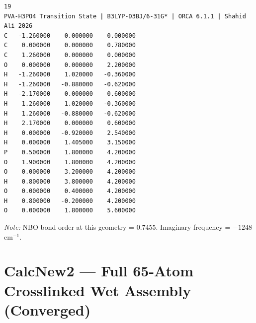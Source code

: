 \documentclass[12pt,a4paper]{report}
\begin{document}
\begin{verbatim}
19
PVA-H3PO4 Transition State | B3LYP-D3BJ/6-31G* | ORCA 6.1.1 | Shahid Ali 2026
C   -1.260000    0.000000    0.000000
C    0.000000    0.000000    0.780000
C    1.260000    0.000000    0.000000
O    0.000000    0.000000    2.200000
H   -1.260000    1.020000   -0.360000
H   -1.260000   -0.880000   -0.620000
H   -2.170000    0.000000    0.600000
H    1.260000    1.020000   -0.360000
H    1.260000   -0.880000   -0.620000
H    2.170000    0.000000    0.600000
H    0.000000   -0.920000    2.540000
H    0.000000    1.405000    3.150000
P    0.500000    1.800000    4.200000
O    1.900000    1.800000    4.200000
O    0.000000    3.200000    4.200000
H    0.800000    3.800000    4.200000
O    0.000000    0.400000    4.200000
H    0.800000   -0.200000    4.200000
O    0.000000    1.800000    5.600000
\end{verbatim}

\textit{Note:} NBO bond order at this geometry = 0.7455. Imaginary frequency = \(-1248\) cm\(^{-1}\).

\section{CalcNew2 — Full 65-Atom Crosslinked Wet Assembly (Converged)}
\end{document}
